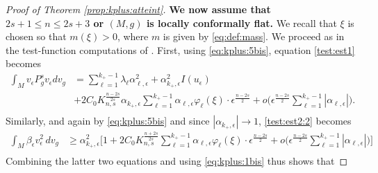 \documentclass[10pt]{amsart}
\numberwithin{equation}{section}
\def\al{{\alpha}}
\def\ep{{\varepsilon}}
\newcommand{\vp}{\varphi}
\def \ep{\epsilon}
\theoremstyle{plain}
\theoremstyle{remark}
\begin{document}
\begin{proof}[Proof of Theorem \ref{prop:kplus:atteint}]
\textbf{We now assume that $2s+1 \le n \le 2s+3$ or $(M,g)$ is locally conformally flat.} We recall that  $ \xi$ is chosen so that $m(\xi) > 0$, where $m$ is given by \eqref{eq:def:mass}. 
We proceed as in the test-function computations of \cite{CAP2}. First, using \eqref{eq:kplus:5bis}, equation \eqref{test:est1} becomes
$$
\begin{aligned}
  \int_{M} v_\ep P_g^s v_\ep dv_g & = \sum_{\ell=1}^{k_+-1} \lambda_\ell \alpha_{\ell,\ep}^2+ \alpha_{k_+, \ep}^2 I(u_\ep) \\
& +  2 C_0 K_{n,s}^{\frac{n-2s}{2s}} \alpha_{k_+,\ep}\sum_{\ell=1}^{k_+-1}  \alpha_{\ell,\ep}   \varphi_{\ell}(\xi)  \cdot \ep^{\frac{n-2s}{2}} + o \big(\ep^{\frac{n-2s}{2}} \sum_{\ell=1}^{k_+-1}|\alpha_{\ell,\ep}| \big). \\
\end{aligned} 
$$
Similarly, and again by \eqref{eq:kplus:5bis} and since $|\alpha_{k_+, \ep}| \to 1$, \eqref{test:est2:2} becomes 
\begin{equation*}
\begin{aligned}
	\int_{M} \beta_\ep v_{\ep}^2\, dv_g & \ge  \alpha_{k_+, \ep}^2\Big[  1 + 2 C_0 K_{n,s}^{\frac{n+2s}{2s}}  \sum_{\ell=1}^{k_+-1}\alpha_{\ell,\ep}   \varphi_{\ell}(\xi)  \cdot \ep^{\frac{n-2s}{2}} + o \big(\ep^{\frac{n-2s}{2}} \sum_{\ell=1}^{k_+-1}|\alpha_{\ell,\ep}| \big)  \Big]\\
	\end{aligned} 
\end{equation*}
Combining the latter two equations and using \eqref{eq:kplus:1bis} thus shows that 

\end{proof}
\end{document}
